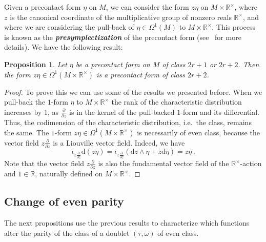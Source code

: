 \documentclass[11pt,twoside]{article}
\theoremstyle{plain}
\newtheorem{proposition}[theorem]{Proposition}
\theoremstyle{definition}
\newcommand{\R}{\mathbb{R}}
\renewcommand{\d}{\mathrm{d}}
\newcommand*{\inn}[1]{\iota_{#1}}
\def\d{\mathrm{d}}
\newcommand\dfn[1]{{\textbf{\emph{#1}}}}
\newcommand{\fracp}[2]{\frac{\partial #1}{\partial #2}}
\def\d{\mathrm{d}}
\begin{document}
Given a precontact form $\eta$ on $M$, we can consider the form $z\eta$ on $M\times \R^{\times}$, where~$z$ is the canonical coordinate of the multiplicative group of nonzero reals $\R^{\times}$, and where we are considering the pull-back of $\eta \in \Omega^1(M)$ to $M\times \R^{\times}$. This process is known as the \dfn{presymplectization} of the precontact form (see~\cite{GG_23} for more details). We have the following result:
\begin{proposition}
Let $\eta$ be a precontact form on $M$ of class $2r+1$ or $2r+2$.
    Then the form $z\eta\in \Omega^1(M\times \R^{\times})$ is a precontact form of class $2r+2$.
\end{proposition}
\begin{proof}
To prove this we can use some of the results we presented before. When we pull-back the $1$-form $\eta$ to $M\times \R^\times$ the rank of the characteristic distribution increases by 1, as $\fracp{}{z}$ is in the kernel of the pull-backed $1$-form and its differential. Thus, the codimension of the characteristic distribution, i.e.\ the class, remains the same. The $1$-form $z\eta \in \Omega^1(M \times \R^{\times})$ is necessarily of even class, because the vector field $z\fracp{}{z}$ is a Liouville vector field. Indeed, we have
$$\inn{z\fracp{}{z}}\d (z\eta) = \inn{z\fracp{}{z}}(\d z \wedge \eta + z\d \eta) = z\eta\,.$$
Note that the vector field $z\fracp{}{z}$ is also the fundamental vector field of the $\R ^{\times}$-action and $1\in \R$, naturally defined on $M \times \R^{\times}$.
    
\end{proof}


\subsection{Change of even parity}


The next propositions use the previous results to characterize which functions alter the parity of the class of a doublet $(\tau,\omega)$ of even class.
\end{document}
